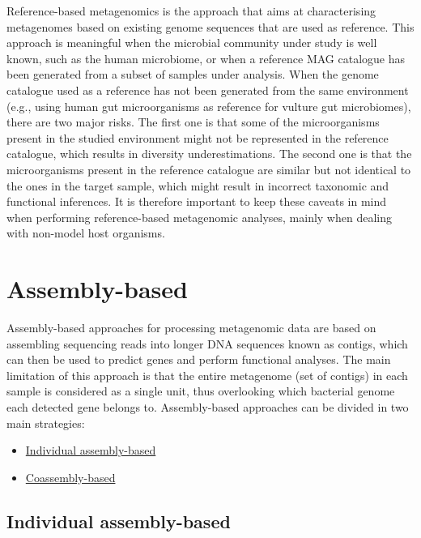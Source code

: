 \documentclass[
]{book}
\providecommand{\tightlist}{%
  \setlength{\itemsep}{0pt}\setlength{\parskip}{0pt}}
\begin{document}
Reference-based metagenomics is the approach that aims at characterising metagenomes based on existing genome sequences that are used as reference. This approach is meaningful when the microbial community under study is well known, such as the human microbiome, or when a reference MAG catalogue has been generated from a subset of samples under analysis. When the genome catalogue used as a reference has not been generated from the same environment (e.g., using human gut microorganisms as reference for vulture gut microbiomes), there are two major risks. The first one is that some of the microorganisms present in the studied environment might not be represented in the reference catalogue, which results in diversity underestimations. The second one is that the microorganisms present in the reference catalogue are similar but not identical to the ones in the target sample, which might result in incorrect taxonomic and functional inferences. It is therefore important to keep these caveats in mind when performing reference-based metagenomic analyses, mainly when dealing with non-model host organisms.

\hypertarget{assembly-based}{%
\section{Assembly-based}\label{assembly-based}}

Assembly-based approaches for processing metagenomic data are based on assembling sequencing reads into longer DNA sequences known as contigs, which can then be used to predict genes and perform functional analyses. The main limitation of this approach is that the entire metagenome (set of contigs) in each sample is considered as a single unit, thus overlooking which bacterial genome each detected gene belongs to. Assembly-based approaches can be divided in two main strategies:

\begin{itemize}
\tightlist
\item
  \protect\hyperlink{individual-assembly-based}{Individual assembly-based}
\item
  \protect\hyperlink{coassembly-based}{Coassembly-based}
\end{itemize}

\hypertarget{individual-assembly-based}{%
\subsection*{Individual assembly-based}\label{individual-assembly-based}}
\end{document}

